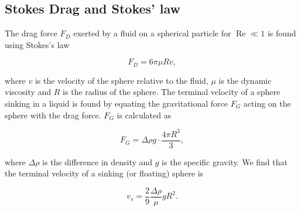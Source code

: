 \subsection{Stokes Drag and Stokes' law}
The drag force $F_D$ exerted by a fluid on a spherical particle for $\operatorname{Re} \ll 1$ is found using  Stokes's law \cite{introfluid2}

\begin{equation}
F_D = 6\pi \mu R v,
\end{equation}

where $v$ is the velocity of the sphere relative to the fluid, $\mu$ is the dynamic viscosity and $R$ is the radius of the sphere. The terminal velocity of a sphere sinking in a liquid is found by equating the gravitational force $F_G$ acting on the sphere with the drag force. $F_G$ is calculated as

\begin{equation}
F_G = \Delta \rho g\cdot \frac{4\pi R^3}{3},
\end{equation}

where $\Delta \rho$ is the difference in density and $g$ is the specific gravity. We find that the terminal velocity of a sinking (or floating) sphere is

\begin{equation}\label{eq:fallingSphere}
v_s = \frac{2}{9} \frac{\Delta \rho}{\mu} g R^2.
\end{equation}
%
